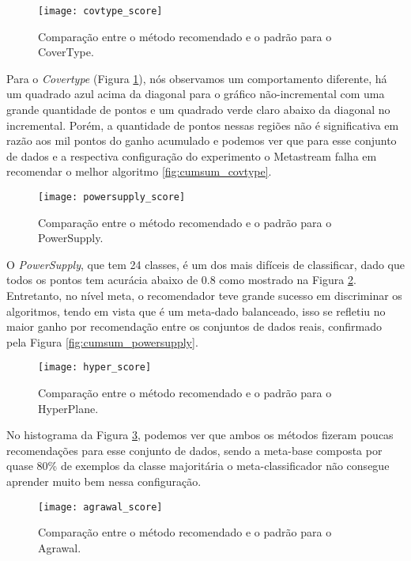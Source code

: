 \begin{figure}[!t]
    \centering
    \texttt{[image: covtype\_score]}
    \caption{Comparação entre o método recomendado e o padrão para o CoverType.}
    \label{fig:scorecross_covtype}
\end{figure}

Para o \textit{Covertype} (Figura \ref{fig:scorecross_covtype}), nós observamos um comportamento diferente, há um quadrado azul acima da diagonal para o gráfico não-incremental com uma grande quantidade de pontos e um quadrado verde claro abaixo da diagonal no incremental. Porém, a quantidade de pontos nessas regiões não é significativa em razão aos mil pontos do ganho acumulado e podemos ver que para esse conjunto de dados e a respectiva configuração do experimento o Metastream falha em recomendar o melhor algoritmo \ref{fig:cumsum_covtype}.

\begin{figure}[!t]
    \centering
    \texttt{[image: powersupply\_score]}
    \caption{Comparação entre o método recomendado e o padrão para o PowerSupply.}
    \label{fig:scorecross_powersupply}
\end{figure}

O \textit{PowerSupply}, que tem 24 classes, é um dos mais difíceis de classificar, dado que todos os pontos tem acurácia abaixo de 0.8 como mostrado na Figura \ref{fig:scorecross_powersupply}. Entretanto, no nível meta, o recomendador teve grande sucesso em discriminar os algoritmos, tendo em vista que é um meta-dado balanceado, isso se refletiu no maior ganho por recomendação entre os conjuntos de dados reais, confirmado pela Figura  \ref{fig:cumsum_powersupply}.

\begin{figure}[!t]
    \centering
    \texttt{[image: hyper\_score]}
    \caption{Comparação entre o método recomendado e o padrão para o HyperPlane.}
    \label{fig:scorecross_hyper}
\end{figure}

No histograma da Figura \ref{fig:scorecross_hyper}, podemos ver que ambos os métodos fizeram poucas recomendações para esse conjunto de dados, sendo a meta-base composta por quase 80\% de exemplos da classe majoritária o meta-classificador não consegue aprender muito bem nessa configuração.

\begin{figure}[!t]
    \centering
    \texttt{[image: agrawal\_score]}
    \caption{Comparação entre o método recomendado e o padrão para o Agrawal.}
    \label{fig:scorecross_agrawal}
\end{figure}


